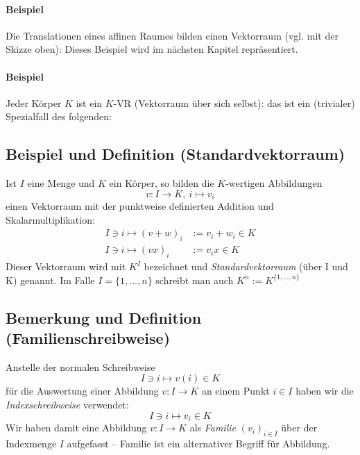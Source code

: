  	\paragraph{Beispiel}
 		Die Translationen eines affinen Raumes bilden einen Vektorraum (vgl. mit der Skizze oben): Dieses Beispiel wird im nächsten Kapitel repräsentiert.

 	\paragraph{Beispiel}
 		Jeder Körper $ K $ ist ein $ K $-VR (Vektorraum über sich selbst): das ist ein (trivialer) Spezialfall des folgenden:

 \subsection{Beispiel und Definition (Standardvektorraum)}
 	\begin{Definition}[Standardvektorraum]
 		Ist $ I $ eine Menge und $ K $ ein Körper, so bilden die $ K $-wertigen Abbildungen
 		\[
 			v: I \to K,\ i \mapsto v_i
 		\]
 		einen Vektorraum mit der punktweise definierten Addition und Skalarmultiplikation:
 		\begin{align*}
 			I\ni i \mapsto (v+w)_i & := v_i+w_i\in K \\
 			I\ni i \mapsto (vx)_i  & := v_ix \in K
 		\end{align*}
 		Dieser Vektorraum wird mit $K^{I}$ bezeichnet und \emph{Standardvektorraum} (über I und K) genannt. Im Falle $ I=\{1,...,n\} $ schreibt man auch $K^{n} := K^{\{1,...,n\}}$
 	\end{Definition}

 \subsection{Bemerkung und Definition (Familienschreibweise)}
 	\begin{Definition}
 		Anstelle der normalen Schreibweise
 		\[
 			I\ni i \mapsto v(i) \in K
 		\]
 		für die Auswertung einer Abbildung  $v: I \to K$ an einem Punkt $i\in I$ haben wir die \emph{Indexschreibweise} verwendet:
 		\[
 			I\ni i \mapsto v_i \in K
 		\]
 		Wir haben damit eine Abbildung $v: I \to K$ als \emph{Familie} $ (v_i)_{i\in I} $ über der Indexmenge $ I $ aufgefasst -- Familie ist ein \glqq alternativer\grqq{} Begriff für Abbildung.
 	\end{Definition}

